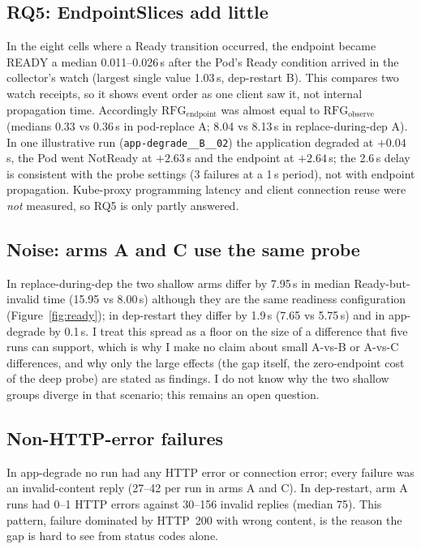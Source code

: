 \documentclass[11pt,a4paper]{article}
\begin{document}
\subsection{RQ5: EndpointSlices add little}
In the eight cells where a Ready transition occurred, the endpoint became READY a median 0.011--0.026\,s after the Pod's Ready condition arrived in the collector's watch (largest single value 1.03\,s, dep-restart B). This compares two watch receipts, so it shows event order as one client saw it, not internal propagation time. Accordingly $\mathrm{RFG}_{\mathrm{endpoint}}$ was almost equal to $\mathrm{RFG}_{\mathrm{observe}}$ (medians 0.33 vs 0.36\,s in pod-replace A; 8.04 vs 8.13\,s in replace-during-dep A). In one illustrative run (\texttt{app-degrade\_\_B\_\_02}) the application degraded at $+0.04$\,s, the Pod went NotReady at $+2.63$\,s and the endpoint at $+2.64$\,s; the 2.6\,s delay is consistent with the probe settings (3 failures at a 1\,s period), not with endpoint propagation. Kube-proxy programming latency and client connection reuse were \emph{not} measured, so RQ5 is only partly answered.

\subsection{Noise: arms A and C use the same probe}\label{sec:noise}
In replace-during-dep the two shallow arms differ by 7.95\,s in median Ready-but-invalid time (15.95 vs 8.00\,s) although they are the same readiness configuration (Figure~\ref{fig:ready}); in dep-restart they differ by 1.9\,s (7.65 vs 5.75\,s) and in app-degrade by 0.1\,s. I treat this spread as a floor on the size of a difference that five runs can support, which is why I make no claim about small A-vs-B or A-vs-C differences, and why only the large effects (the gap itself, the zero-endpoint cost of the deep probe) are stated as findings. I do not know why the two shallow groups diverge in that scenario; this remains an open question.

\subsection{Non-HTTP-error failures}\label{sec:http}
In app-degrade no run had any HTTP error or connection error; every failure was an invalid-content reply (27--42 per run in arms A and C). In dep-restart, arm A runs had 0--1 HTTP errors against 30--156 invalid replies (median 75). This pattern, failure dominated by HTTP~200 with wrong content, is the reason the gap is hard to see from status codes alone.
\end{document}
